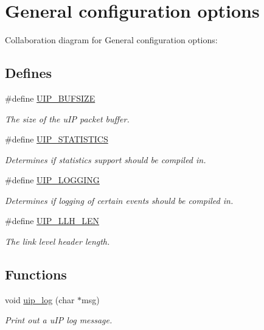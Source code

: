 \hypertarget{a00076}{
\section{General configuration options}
\label{a00076}
}


Collaboration diagram for General configuration options:

\subsection*{Defines}
\begin{CompactItemize}
\item 
\#define \hyperlink{a00076_g3589822ecb9d9c4145209756396b8a6b}{UIP\_\-BUFSIZE}
\begin{CompactList}\small\item\em The size of the u\-IP packet buffer. \item\end{CompactList}\item 
\#define \hyperlink{a00076_g5726142fec34f35fb9ea19e5a45975c6}{UIP\_\-STATISTICS}
\begin{CompactList}\small\item\em Determines if statistics support should be compiled in. \item\end{CompactList}\item 
\#define \hyperlink{a00076_g21664b7441cfa37d280228d23316d609}{UIP\_\-LOGGING}
\begin{CompactList}\small\item\em Determines if logging of certain events should be compiled in. \item\end{CompactList}\item 
\#define \hyperlink{a00076_ge6f4a2453dbd8bc60e6a82774552366a}{UIP\_\-LLH\_\-LEN}
\begin{CompactList}\small\item\em The link level header length. \item\end{CompactList}\end{CompactItemize}
\subsection*{Functions}
\begin{CompactItemize}
\item 
void \hyperlink{a00076_gb58e1ceb7cb73ca2bcd73146b6c1b4e7}{uip\_\-log} (char $\ast$msg)
\begin{CompactList}\small\item\em Print out a u\-IP log message. \item\end{CompactList}\end{CompactItemize}


